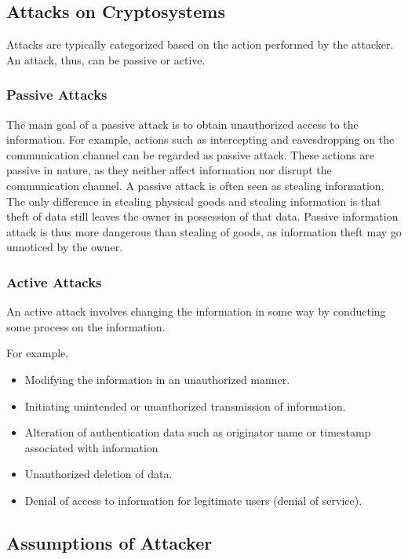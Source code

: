 \documentclass[british]{article}
\begin{document}
\subsection{Attacks on Cryptosystems}

Attacks are typically categorized based on the action performed by
the attacker. An attack, thus, can be passive or active.

\subsubsection{Passive Attacks}

The main goal of a passive attack is to obtain unauthorized access
to the information. For example, actions such as intercepting and
eavesdropping on the communication channel can be regarded as passive
attack. These actions are passive in nature, as they neither affect
information nor disrupt the communication channel. A passive attack
is often seen as stealing information. The only difference in stealing
physical goods and stealing information is that theft of data still
leaves the owner in possession of that data. Passive information attack
is thus more dangerous than stealing of goods, as information theft
may go unnoticed by the owner.

\subsubsection{Active Attacks}

An active attack involves changing the information in some way by
conducting some process on the information.

For example, 
\begin{itemize}
\item Modifying the information in an unauthorized manner. 
\item Initiating unintended or unauthorized transmission of information. 
\item Alteration of authentication data such as originator name or timestamp
associated with information 
\item Unauthorized deletion of data. 
\item Denial of access to information for legitimate users (denial of service). 
\end{itemize}

\subsection{Assumptions of Attacker}
\end{document}
